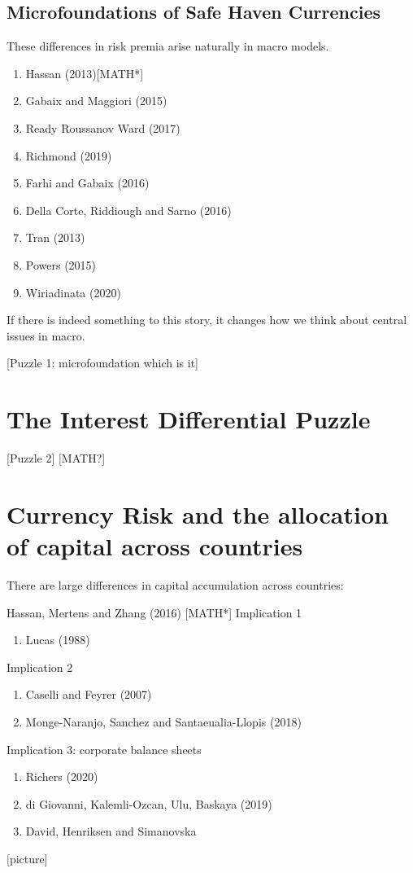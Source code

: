 \documentclass[12pt,letter]{article}
\theoremstyle{break} \theorembodyfont{\normalfont\itshape}
\theoremstyle{break}
\theoremstyle{break} \theorembodyfont{\normalfont\itshape}
\theoremstyle{break} \theorembodyfont{\normalfont\itshape}
\begin{document}
\subsection{Microfoundations of Safe Haven Currencies}
These differences in risk premia arise naturally in macro models.
\begin{enumerate}
\item Hassan (2013)[MATH*]
\item Gabaix and Maggiori (2015)
\item Ready Roussanov Ward (2017)
\item Richmond (2019)
\item Farhi and Gabaix (2016)
\item Della Corte, Riddiough and Sarno (2016)
\item Tran (2013)
\item Powers (2015)
\item Wiriadinata (2020)
\end{enumerate}



If there is indeed something to this story, it changes how we think
about central issues in macro.

[Puzzle 1: microfoundation which is it]

\section{The Interest Differential Puzzle}

[Puzzle 2]
[MATH?]

\section{Currency Risk and the allocation of capital across countries}
There are large differences in capital accumulation across countries:

Hassan, Mertens and Zhang (2016)
[MATH*]
Implication 1
\begin{enumerate}
\item Lucas (1988)
\end{enumerate}
Implication 2
\begin{enumerate}
\item Caselli and Feyrer (2007)
\item Monge-Naranjo, Sanchez and Santaeualia-Llopis (2018)
\end{enumerate}
Implication 3: corporate balance sheets
\begin{enumerate}
\item Richers (2020)
\item di Giovanni, Kalemli-Ozcan, Ulu, Baskaya (2019)
\item David, Henriksen and Simanovska
\end{enumerate} [picture]
\end{document}
